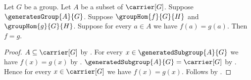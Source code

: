 \begin{theorem}\label{group_hom_equality_from_generators}
    Let $G$ be a group.
    Let $A$ be a subset of $\carrier[G]$.
    Suppose $\generatesGroup{A}{G}$.
    Suppose $\groupHom{f}{G}{H}$ and $\groupHom{g}{G}{H}$.
    Suppose for every $a\in A$ we have $f(a)=g(a)$.
    Then $f=g$.
\end{theorem}
\begin{proof}
    $A\subseteq\carrier[G]$ by
        .
    For every $x\in\generatedSubgroup{A}{G}$ we have $f(x)=g(x)$ by
        .
    $\generatedSubgroup{A}{G}=\carrier[G]$ by
        .
    Hence for every $x\in\carrier[G]$ we have $f(x)=g(x)$.
    Follows by .
\end{proof}
